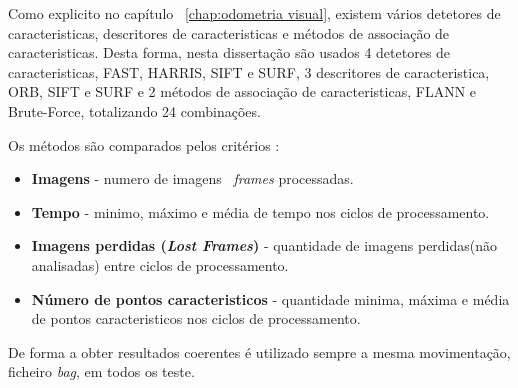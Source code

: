Como explicito no capítulo ~\ref{chap:odometria visual}, existem vários detetores de caracteristicas, descritores de caracteristicas e métodos de associação de caracteristicas. Desta forma, nesta dissertação são usados 4 detetores de caracteristicas, FAST, HARRIS, SIFT e SURF, 3 descritores de caracteristica, ORB, SIFT e SURF e 2 métodos de associação de caracteristicas, FLANN e Brute-Force, totalizando 24 combinações.

Os métodos são comparados pelos critérios :
\begin{itemize}
	\item \textbf{Imagens} - numero de imagens \ \textit{frames} processadas.
	\item \textbf{Tempo} - minimo, máximo e média de tempo nos ciclos de processamento.
	\item \textbf{Imagens perdidas (\textit{Lost Frames})} - quantidade de imagens perdidas(não analisadas) entre ciclos de processamento.
	\item \textbf{Número de pontos caracteristicos} - quantidade minima, máxima e média de pontos caracteristicos nos ciclos de processamento.
\end{itemize}


De forma a obter resultados coerentes é utilizado sempre a mesma movimentação, ficheiro \textit{bag}, em todos os teste. 




